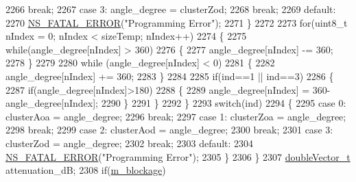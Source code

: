 \begin{DoxyCode}
2266                                 \textcolor{keywordflow}{break};
2267                 \textcolor{keywordflow}{case} 3: angle\_degree = clusterZod;
2268                                 \textcolor{keywordflow}{break};
2269                 \textcolor{keywordflow}{default}:
2270                         \hyperlink{group__fatal_ga5131d5e3f75d7d4cbfd706ac456fdc85}{NS\_FATAL\_ERROR}(\textcolor{stringliteral}{"Programming Error"});
2271                 \}
2272 
2273                 \textcolor{keywordflow}{for}(uint8\_t nIndex = 0; nIndex < sizeTemp; nIndex++)
2274                 \{
2275                         \textcolor{keywordflow}{while}(angle\_degree[nIndex] > 360)
2276                         \{
2277                                 angle\_degree[nIndex] -= 360;
2278                         \}
2279 
2280                         \textcolor{keywordflow}{while} (angle\_degree[nIndex] < 0)
2281                         \{
2282                                 angle\_degree[nIndex] += 360;
2283                         \}
2284 
2285                         \textcolor{keywordflow}{if}(ind==1 || ind==3)
2286                         \{
2287                                 \textcolor{keywordflow}{if}(angle\_degree[nIndex]>180)
2288                                 \{
2289                                         angle\_degree[nIndex] = 360-angle\_degree[nIndex];
2290                                 \}
2291                         \}
2292                 \}
2293                 \textcolor{keywordflow}{switch}(ind)
2294                 \{
2295                 \textcolor{keywordflow}{case} 0: clusterAoa = angle\_degree;
2296                                 \textcolor{keywordflow}{break};
2297                 \textcolor{keywordflow}{case} 1: clusterZoa = angle\_degree;
2298                                 \textcolor{keywordflow}{break};
2299                 \textcolor{keywordflow}{case} 2: clusterAod = angle\_degree;
2300                                 \textcolor{keywordflow}{break};
2301                 \textcolor{keywordflow}{case} 3: clusterZod = angle\_degree;
2302                                 \textcolor{keywordflow}{break};
2303                 \textcolor{keywordflow}{default}:
2304                         \hyperlink{group__fatal_ga5131d5e3f75d7d4cbfd706ac456fdc85}{NS\_FATAL\_ERROR}(\textcolor{stringliteral}{"Programming Error"});
2305                 \}
2306         \}
2307         \hyperlink{namespacens3_aa6f1edf6566ca6afec613bc6e40240ea}{doubleVector\_t} attenuation\_dB;
2308         \textcolor{keywordflow}{if}(\hyperlink{classns3_1_1MmWave3gppChannel_a5f19d0ed379e7db9448f4f668e0c7927}{m\_blockage})

\end{DoxyCode}
